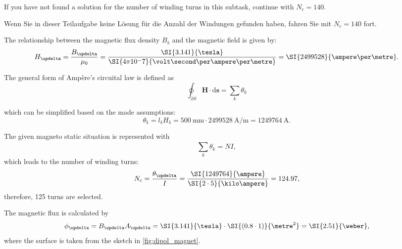 \begin{hintblock}
    If you have not found a solution for the number of winding turns in this subtask, continue with $N_{\mathrm{c}} = 140$. 
\end{hintblock}
\begin{germanhintblock}
    Wenn Sie in dieser Teilaufgabe keine Lösung für die Anzahl der Windungen gefunden haben, fahren Sie mit $N_{\mathrm{c}} = 140$ fort.
\end{germanhintblock}


\begin{solutionblock}
    The relationship between the magnetic flux density $B_{\updelta}$ and the magnetic field is given by:
    $$ H_{\updelta} = \frac{B_{\updelta}}{\mu_0} = \frac{\SI{3.141}{\tesla}}{\SI{4\pi 10^-7}{\volt\second\per\ampere\per\metre}} = \SI{2499528}{\ampere\per\metre}.$$

    The general form of Ampère's circuital law is defined as 
    $$ \oint_{\partial S} \bm{H} \cdot \mathrm{d}\bm{s} = \sum_k \theta_k$$

    which can be simplified based on the made assumptions:
    $$\theta_{\updelta} = l_{\updelta} H_{\updelta} = \SI{500}{\milli\metre} \cdot \SI{2499528}{\ampere\per\metre} = \SI{1249764}{\ampere}. $$

    The given magneto static situation is represented with
    $$ \sum_{k}^{} \theta_{k} = N I,$$
    which leads to the number of winding turns:
    $$ N_{\mathrm{c}} = \frac{\theta_{\updelta}}{I} = \frac{\SI{1249764}{\ampere}}{\SI{2\cdot5}{\kilo\ampere}} = 124.97,$$
    therefore, 125 turns are selected.

\end{solutionblock}



\begin{solutionblock}
    The magnetic flux is calculated by
    $$ \phi_{\updelta} = B_{\updelta} A_{\updelta} = \SI{3.141}{\tesla} \cdot \SI{(0.8\cdot 1)}{\metre^2} = \SI{2.51}{\weber},$$
    where the surface is taken from the sketch in \autoref{fig:dipol_magnet}.

\end{solutionblock}


